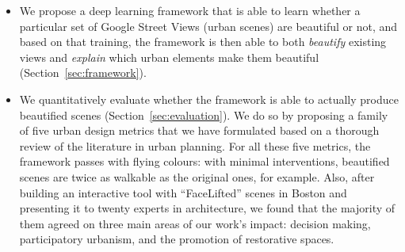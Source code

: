 \begin{itemize}
\item We propose a deep learning framework that is able to learn whether a particular set of Google Street Views (urban scenes) are beautiful or not, and based on that training, the framework is then able to both \emph{beautify} existing views and \emph{explain} which urban elements  make them beautiful (Section~\ref{sec:framework}). 

\item We quantitatively evaluate whether the framework is able to actually produce beautified scenes (Section~\ref{sec:evaluation}). We do so by proposing a family of five urban design metrics that we have formulated based on a thorough review of the literature in urban planning. For all these five metrics, the framework passes with flying colours: with minimal interventions, beautified scenes are twice as walkable as the original ones, for example. Also, after building an interactive tool with ``FaceLifted'' scenes in Boston and presenting it to twenty experts in architecture,  we found that the majority of them agreed on three main areas of our work's impact: decision making, participatory urbanism, and the promotion of restorative spaces. 
\end{itemize}






